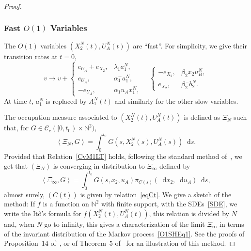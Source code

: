 \documentclass[english]{amsart}
\newcommand{\N}{\ensuremath{\mathbb{N}}}
\newcommand{\diff}{\mathop{}\mathopen{}\mathrm{d}}
\newcommand{\cal}[1]{\ensuremath{\mathcal{#1}}}
\newcommand\croc[1]{\left\langle #1\right\rangle}
\numberwithin{proposition}{section}
\begin{document}
\begin{proof}
\subsubsection{Fast $O(1)$ Variables}\label{O1FSec}
The $O(1)$ variables $(X_2^N(t), U_A^N(t))$ are ``fast''. For simplicity, we give their transition rates at $t=0$,
\begin{equation}\label{O1SHEq1}
v{\longrightarrow}   v{+} 
\begin{cases}
\scriptstyle{e_{U_A}{+}e_{X_2}}, &\scriptstyle{\lambda_1a_1^N},\\
\scriptstyle{e_{U_A}}, & \scriptstyle{\alpha_1^-a_1^N},\\
\scriptstyle{{-}e_{U_A}}, &\scriptstyle{\alpha_1 u_Ax_1^N},
\end{cases}
\quad
\begin{cases}
\scriptstyle{{-}e_{X_2}}, &\scriptstyle{\beta_2x_2u_B^N},\\
\scriptstyle{e_{X_2}}, &\scriptstyle{\beta_2^-b_2^N}.
\end{cases}
\end{equation}
At time $t$, $a_1^N$ is replaced by $A_1^N(t)$ and similarly for the other slow variables. 

The occupation measure associated to $(X_2^N(t), U_A^N(t))$ is defined as $\Xi_N$ such that, for $G{\in}{\cal C}_c([0,t_0){\times}\N^2)$,
\begin{equation}\label{XiN}
\croc{\Xi_N,G}=\int_0^{t_0} G(s,X_2^N(s), U_A^N(s))\diff s. 
\end{equation}
Provided that Relation~\eqref{CvM1LT} holds, following the standard method of~\citet{Kurtz1992}, we get that
$(\Xi_N)$ is converging in distribution to $\Xi_\infty$ defined by
\[
\croc{\Xi_\infty,G}=\int_0^{t_0} G(s,x_2, u_A)\pi_{C(s)}(\diff x_2, \diff u_A)\diff s,
\]
almost surely, $(C(t))$ is given by relation~\eqref{eqCt}. We give a sketch of the method: If $f$ is a function on $\N^2$ with finite support, with the SDEs~\eqref{SDE}, we  write the It\^o's formula for  $f(X_2^N(t), U_A^N(t))$, this relation is divided by  $N$ and, when $N$  go to infinity, this gives a characterization of the limit $\Xi_\infty$ in terms of the invariant distribution of the Markov process~\eqref{O1SHEq1}. See the proofs of Proposition~14 of~\cite{LR24-2}, or of Theorem~5 of~\cite{LR24} for an illustration of this method. 


\end{proof}
\end{document}
